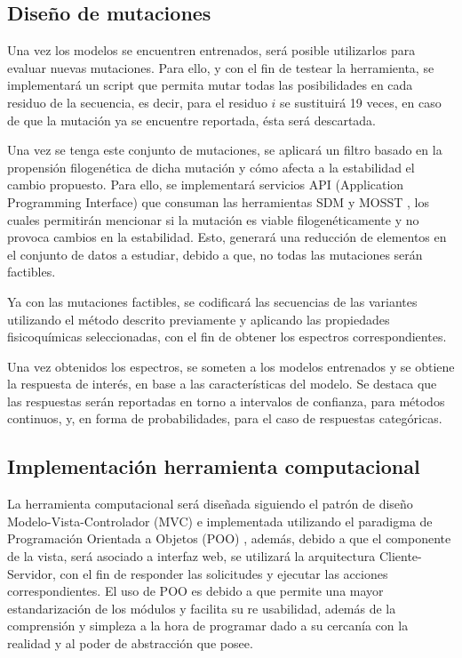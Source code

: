 \subsection{Diseño de mutaciones}

Una vez los modelos se encuentren entrenados, será posible utilizarlos para evaluar nuevas mutaciones. Para ello, y con el fin de testear la herramienta, se implementará un script que permita mutar todas las posibilidades en cada residuo de la secuencia, es decir, para el residuo $i$ se sustituirá 19 veces, en caso de que la mutación ya se encuentre reportada, ésta será descartada. 

Una vez se tenga este conjunto de mutaciones, se aplicará un filtro basado en la propensión filogenética de dicha mutación y cómo afecta a la estabilidad el cambio propuesto. Para ello, se implementará servicios API (Application Programming Interface) que consuman las herramientas SDM \cite{Pandurangan2017} y MOSST \cite{Olivera-Nappa2011}, los cuales permitirán mencionar si la mutación es viable filogenéticamente y no provoca cambios en la estabilidad. Esto, generará una reducción de elementos en el conjunto de datos a estudiar, debido a que, no todas las mutaciones serán factibles. 

Ya con las mutaciones factibles, se codificará las secuencias de las variantes utilizando el método descrito previamente y aplicando las propiedades fisicoquímicas seleccionadas, con el fin de obtener los espectros correspondientes. 

Una vez obtenidos los espectros, se someten a los modelos entrenados y se obtiene la respuesta de interés, en base a las características del modelo. Se destaca que las respuestas serán reportadas en torno a intervalos de confianza, para métodos continuos, y, en forma de probabilidades, para el caso de respuestas categóricas.
 
\subsection{Implementación herramienta computacional}

La herramienta computacional será diseñada siguiendo el patrón de diseño Modelo-Vista-Controlador (MVC) \cite{krasner1988description} e implementada utilizando el paradigma de Programación Orientada a Objetos (POO) \cite{wegner1990concepts}, además, debido a que el componente de la vista, será asociado a interfaz web, se utilizará la arquitectura Cliente-Servidor, con el fin de responder las solicitudes y ejecutar las acciones correspondientes. El uso de POO es debido a que permite una mayor estandarización de los módulos y facilita su re usabilidad, además de la comprensión y simpleza a la hora de programar dado a su cercanía con la realidad y al poder de abstracción que posee.

